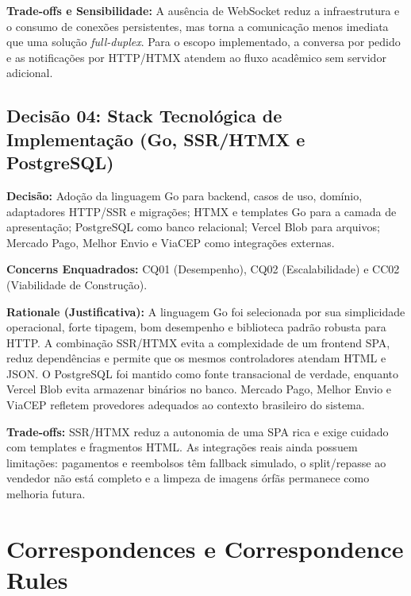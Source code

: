 ﻿\documentclass[12pt,a4paper]{article}
\begin{document}
\vspace{0.3cm}
\noindent\textbf{Trade-offs e Sensibilidade:} A ausência de WebSocket reduz a infraestrutura e o consumo de conexões persistentes, mas torna a comunicação menos imediata que uma solução \textit{full-duplex}. Para o escopo implementado, a conversa por pedido e as notificações por HTTP/HTMX atendem ao fluxo acadêmico sem servidor adicional.

\subsection{Decisão 04: Stack Tecnológica de Implementação (Go, SSR/HTMX e PostgreSQL)}

\noindent\textbf{Decisão:} Adoção da linguagem Go para backend, casos de uso, domínio, adaptadores HTTP/SSR e migrações; HTMX e templates Go para a camada de apresentação; PostgreSQL como banco relacional; Vercel Blob para arquivos; Mercado Pago, Melhor Envio e ViaCEP como integrações externas.

\vspace{0.3cm}
\noindent\textbf{Concerns Enquadrados:} CQ01 (Desempenho), CQ02 (Escalabilidade) e CC02 (Viabilidade de Construção).

\vspace{0.3cm}
\noindent\textbf{Rationale (Justificativa):} 
A linguagem Go foi selecionada por sua simplicidade operacional, forte tipagem, bom desempenho e biblioteca padrão robusta para HTTP. A combinação SSR/HTMX evita a complexidade de um frontend SPA, reduz dependências e permite que os mesmos controladores atendam HTML e JSON. O PostgreSQL foi mantido como fonte transacional de verdade, enquanto Vercel Blob evita armazenar binários no banco. Mercado Pago, Melhor Envio e ViaCEP refletem provedores adequados ao contexto brasileiro do sistema.

\vspace{0.3cm}
\noindent\textbf{Trade-offs:} SSR/HTMX reduz a autonomia de uma SPA rica e exige cuidado com templates e fragmentos HTML. As integrações reais ainda possuem limitações: pagamentos e reembolsos têm fallback simulado, o split/repasse ao vendedor não está completo e a limpeza de imagens órfãs permanece como melhoria futura.

\section{Correspondences e Correspondence Rules}
\end{document}
